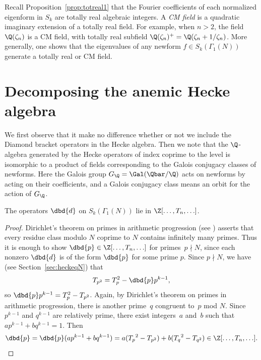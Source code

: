 \documentclass{report}
\begin{document}
\begin{remark}
  Recall Proposition~\ref{prop:totreal1} that the Fourier coefficients
  of each normalized eigenform in $S_k$ are totally real algebraic
  integers.  A {\em CM field} is a quadratic imaginary extension of a
  totally real field.  For example, when $n>2$, the field
  $\Q(\zeta_n)$ is a CM field, with totally real subfield
  $\Q(\zeta_n)^+ = \Q(\zeta_n + 1/\zeta_n)$.  More generally, one
  shows that the eigenvalues of any newform $f\in S_k(\Gamma_1(N))$
  generate a totally real or CM field.
\end{remark}

\section{Decomposing the anemic Hecke algebra}\label{sec:decomp_anemic}
We first observe that it make no difference whether or not we
include the Diamond bracket operators in the Hecke algebra.  Then
we note that the $\Q$-algebra generated by the Hecke operators of
index coprime to the level is isomorphic to a product of fields
corresponding to the Galois conjugacy classes of newforms.
Here the Galois group $G_{\Q} = \Gal(\Qbar/\Q)$
acts on newforms by acting on their coefficients, and a Galois
conjugacy class means an orbit for the action of $G_{\Q}$.

\begin{proposition}
The operators $\dbd{d}$ on $S_k(\Gamma_1(N))$ lie in
$\Z[\ldots,T_n,\ldots]$.
\end{proposition}
\begin{proof}
Dirichlet's theorem on primes in arithmetic progression
(see \cite[VIII.4]{lang:ant}) asserts that every residue
class modulo $N$ coprime to $N$ contains infinitely many
primes.
Thus it is enough to show $\dbd{p}\in\Z[\ldots,T_n,\ldots]$ for
primes~$p\nmid N$, since each nonzero $\dbd{d}$ is of the form $\dbd{p}$ for
some prime $p$.
Since $p\nmid N$, we have (see Section~\ref{sec:heckeqN}) that
\[
  T_{p^2} = T_p^2 - \dbd{p}p^{k-1},
\]
so $\dbd{p}p^{k-1} = T_p^2 - T_{p^2}$.
Again, by Dirichlet's theorem
on primes in arithmetic progression, there is another prime~$q$
congruent to~$p$ mod $N$. Since $p^{k-1}$ and $q^{k-1}$ are relatively
prime, there exist integers~$a$ and~$b$ such that $a p^{k-1} + b
q^{k-1} = 1$. Then
\[
\dbd{p}=\dbd{p}(a p^{k-1} + b q^{k-1})
       = a({T_p}^2-T_{p^2}) + b({T_q}^2-T_{q^2})
       \in \Z[\ldots, T_n,\ldots].
\]
\end{proof}
\end{document}
